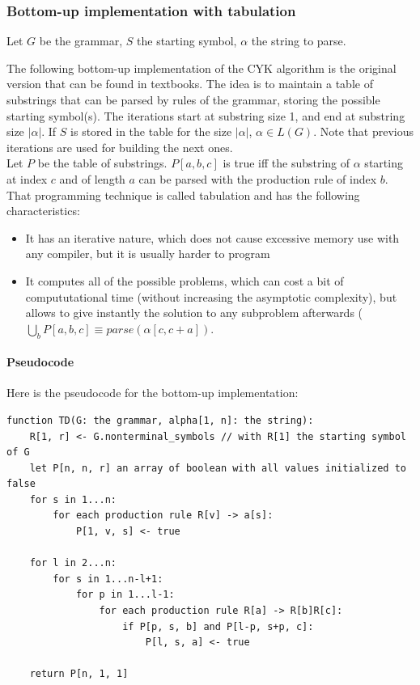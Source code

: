 \documentclass[twocolumn]{article}
\begin{document}
\subsubsection{Bottom-up implementation with tabulation}
Let $G$ be the grammar, $S$ the starting symbol, $\alpha$ the string to parse.\par

The following bottom-up implementation of the CYK algorithm is the original version that can be found in textbooks. The idea is to maintain a table of substrings that can be parsed by rules of the grammar, storing the possible starting symbol(s). The iterations start at substring size 1, and end at substring size $|\alpha|$. If $S$ is stored in the table for the size $|\alpha|$, $\alpha\in L(G)$. Note that previous iterations are used for building the next ones.\\
Let $P$ be the table of substrings. $P[a,b,c]$ is true iff the substring of $\alpha$ starting at index $c$ and of length $a$ can be parsed with the production rule of index $b$.\\
That programming technique is called tabulation and has the following characteristics:
\begin{itemize}
\item It has an iterative nature, which does not cause excessive memory use with any compiler, but it is usually harder to program
  \item It computes all of the possible problems, which can cost a bit of compututational time (without increasing the asymptotic complexity), but allows to give instantly the solution to any subproblem afterwards ($\displaystyle\bigcup_bP[a,b,c]\equiv parse(\alpha[c, c+a])$.
\end{itemize}

\paragraph{Pseudocode} Here is the pseudocode for the bottom-up implementation:
\begin{lstlisting}
function TD(G: the grammar, alpha[1, n]: the string):
    R[1, r] <- G.nonterminal_symbols // with R[1] the starting symbol of G
    let P[n, n, r] an array of boolean with all values initialized to false
    for s in 1...n:
        for each production rule R[v] -> a[s]:
            P[1, v, s] <- true
    
    for l in 2...n:
        for s in 1...n-l+1:
            for p in 1...l-1:
                for each production rule R[a] -> R[b]R[c]:
                    if P[p, s, b] and P[l-p, s+p, c]: 
                        P[l, s, a] <- true

    return P[n, 1, 1]
\end{lstlisting}
\end{document}
